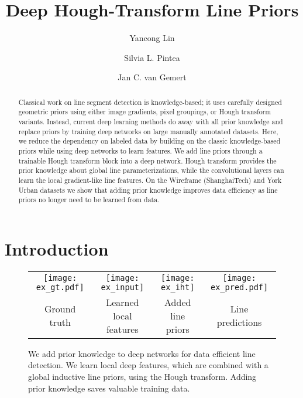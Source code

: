 \documentclass[runningheads]{llncs}
\begin{document}
\pagestyle{headings}
\mainmatter
\def\ECCVSubNumber{4061}  

\title{Deep Hough-Transform Line Priors} 


\begin{comment}
\titlerunning{ECCV-20 submission ID \ECCVSubNumber} 
\authorrunning{ECCV-20 submission ID \ECCVSubNumber} 
\author{Anonymous ECCV submission}
\institute{Paper ID \ECCVSubNumber}
\end{comment}
\author{Yancong Lin \and Silvia L. Pintea \and Jan C. van Gemert}


\maketitle
\begin{abstract}
Classical work on line segment detection  is knowledge-based; it uses carefully designed geometric priors using either image gradients, pixel groupings, or Hough transform variants.
Instead, current deep learning methods do away with all prior knowledge and replace priors by training deep networks on large manually annotated  datasets.
Here, we reduce the dependency on labeled data by building on the classic knowledge-based priors while using deep networks to learn features. 
We add line priors through a trainable Hough transform block into a deep network. 
Hough transform provides the prior knowledge about global line parameterizations, while the convolutional layers can learn the local gradient-like line features. 
On the  Wireframe (ShanghaiTech) and York Urban datasets we show that adding prior knowledge improves data efficiency as line priors no longer need to be learned from data.
\end{abstract}
 \section{Introduction}
\begin{figure}[t]
    \centering
    \begin{tabular}{cccc}
        \texttt{[image: ex\_gt.pdf]} &
        \texttt{[image: ex\_input]} &
        \texttt{[image: ex\_iht]} & 
        \texttt{[image: ex\_pred.pdf]} \\
        \footnotesize{Ground truth} & \footnotesize{Learned local features} & \footnotesize{Added line priors} & \footnotesize{Line predictions} \\
    \end{tabular}
    \caption{We add prior knowledge to deep networks for data efficient line detection. 
    We learn local deep features, which are combined with a global inductive line priors, using the Hough transform. Adding prior knowledge saves valuable training data.}
    \label{fig:global}
\end{figure}
\end{document}
